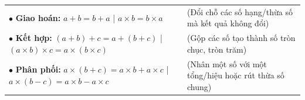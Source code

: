 \documentclass[14pt,a4paper,oneside]{extbook}
\begin{document}
\vspace{3mm}

\noindent
\begin{tcolorbox}[
  enhanced,
  title={\footnotesize\bfseries\color{white}\faStar\ 3. Các tính chất quan trọng để tính nhanh, tính thuận tiện},
  colback=purple!2!white,
  colframe=purple!70!black,
  arc=2.5mm, boxrule=0.8pt, top=1.8mm, bottom=1.8mm, left=2.5mm, right=2.5mm
]
  \footnotesize
  \begin{tabular}{ll}
    $\bullet$ \textbf{Giao hoán:} $a + b = b + a$ \quad | \quad $a \times b = b \times a$ & (Đổi chỗ các số hạng/thừa số mà kết quả không đổi)\\
    $\bullet$ \textbf{Kết hợp:} $(a + b) + c = a + (b + c)$ \quad | \quad $(a \times b) \times c = a \times (b \times c)$ & (Gộp các số tạo thành số tròn chục, tròn trăm)\\
    $\bullet$ \textbf{Phân phối:} $a \times (b + c) = a \times b + a \times c$ \quad | \quad $a \times (b - c) = a \times b - a \times c$ & (Nhân một số với một tổng/hiệu hoặc rút thừa số chung)
  \end{tabular}
\end{tcolorbox}

\vspace{3mm}
\end{document}
